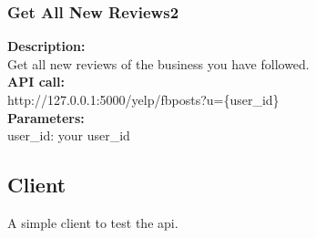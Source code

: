 \documentclass[12pt]{article}
\begin{document}
\subsubsection{Get All New Reviews2}
\textbf{Description:}\\
Get all new reviews of the business you have followed.\\
\textbf{API call:}\\ 
http://127.0.0.1:5000/yelp/fbposts?u=\{user\_id\}\\
\textbf{Parameters:}\\
user\_id: your user\_id

\subsection{Client}
A simple client to test the api.
\end{document}
